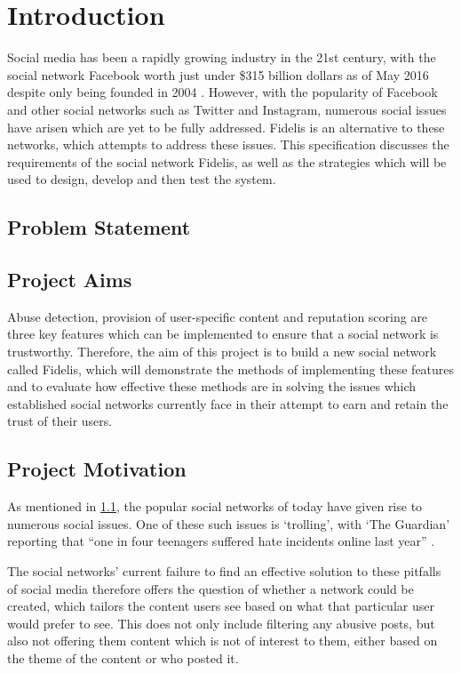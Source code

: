 \chapter{Introduction}
\label{Chapter:Introduction}

Social media has been a rapidly growing industry in the 21st century, with the social network Facebook worth just under \$315 billion dollars as of May 2016 despite only being founded in 2004 \cite{Forbes:Facebook}. However, with the popularity of Facebook and other social networks such as Twitter and Instagram, numerous social issues have arisen which are yet to be fully addressed. Fidelis is an alternative to these networks, which attempts to address these issues. This specification discusses the requirements of the social network Fidelis, as well as the strategies which will be used to design, develop and then test the system.

\section{Problem Statement}
\label{Section:ProblemStatement}

\section{Project Aims}
Abuse detection, provision of user-specific content and reputation scoring are three key features which can be implemented to ensure that a social network is trustworthy. Therefore, the aim of this project is to build a new social network called Fidelis, which will demonstrate the methods of implementing these features and to evaluate how effective these methods are in solving the issues which established social networks currently face in their attempt to earn and retain the trust of their users.

\section{Project Motivation}
As mentioned in \ref{Section:ProblemStatement}, the popular social networks of today have given rise to numerous social issues. One of these such issues is `trolling', with `The Guardian' reporting that ``one in four teenagers suffered hate incidents online last year'' \cite{Gani:Trolling}. 

The social networks' current failure to find an effective solution to these pitfalls of social media therefore offers the question of whether a network could be created, which tailors the content users see based on what that particular user would prefer to see. This does not only include filtering any abusive posts, but also not offering them content which is not of interest to them, either based on the theme of the content or who posted it.


